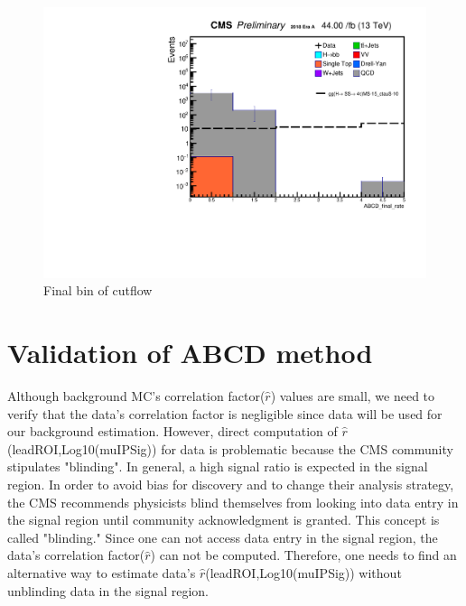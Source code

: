 \begin{figure}[h!]
   \caption{Final bin of cutflow}
   \label{fig:Finalbin}
   \centering
   \includegraphics[width=0.67\linewidth]{figs/log_CutflAnalysisNote_MS-15_ctauS-10_ABCD_final_rate.pdf}
 \end{figure}

\section{Validation of ABCD method}
Although background MC's correlation factor($\hat{r}$) values are small, we need to verify that the data's correlation factor is negligible since data will be used for our background estimation.
However, direct computation of $\hat{r}$(leadROI,Log10(muIPSig)) for data is problematic because the CMS community stipulates "blinding".
In general, a high signal ratio is expected in the signal region.
In order to avoid bias for discovery and to change their analysis strategy, the CMS recommends physicists blind themselves from looking into data entry in the signal region until community acknowledgment is granted.
This concept is called "blinding."
Since one can not access data entry in the signal region, the data's correlation factor($\hat{r}$) can not be computed.
Therefore, one needs to find an alternative way to estimate data's $\hat{r}$(leadROI,Log10(muIPSig)) without unblinding data in the signal region.

